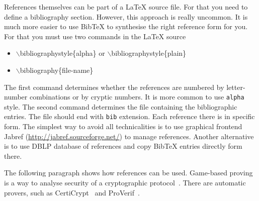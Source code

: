 \documentclass[12pt]{article}
\begin{document}
References themselves can be part of a LaTeX source file. For that you need to define a bibliography section. However, this approach is really uncommon. It is much more easier to use BibTeX to synthesise the right reference form for you. For that you must use two commands in the LaTeX source
\begin{itemize}
\item $\backslash$bibliographystyle\{alpha\} or $\backslash$bibliographystyle\{plain\}
\item $\backslash$bibliography\{file-name\}
\end{itemize}
The first command determines whether the references are numbered by letter-number combinations or by cryptic numbers. It is more common to use \texttt{alpha} style. The second command determines the file containing the bibliographic entries. The file should end with \texttt{bib} extension. Each reference there is in specific form. The simplest way to avoid all technicalities is to use graphical frontend  Jabref (\url{http://jabref.sourceforge.net/}) to manage references. Another alternative is to use DBLP database of references and copy BibTeX entries directly form there.   
    
   
The following paragraph shows how references can be used. Game-based proving is a way to analyse security of a cryptographic protocol~\cite{GameB_1, GameB_2}. There are automatic provers, such as {CertiCrypt\-}~\cite{certicrypt} and ProVerif~\cite{proVerif}.
\end{document}
